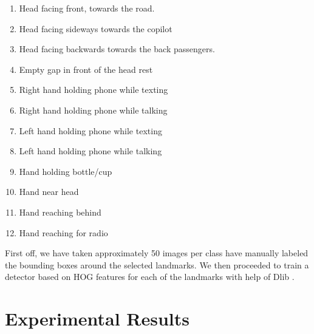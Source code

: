 \documentclass[10pt,twocolumn,letterpaper]{article}
\begin{document}
\begin{enumerate}
	\item Head facing front, towards the road.
	\item Head facing sideways towards the copilot
	\item Head facing backwards towards the back passengers.
	\item Empty gap in front of the head rest
	\item Right hand holding phone while texting
	\item Right hand holding phone while talking\
	\item Left hand holding phone while texting
	\item Left hand holding phone while talking
	\item Hand holding bottle/cup
	\item Hand near head
	\item Hand reaching behind
	\item Hand reaching for radio	
\end{enumerate}




First off, we have taken approximately 50 images per class have manually labeled the bounding boxes around the selected landmarks. We then proceeded to train a detector based on HOG features for each of the landmarks with  help of Dlib \cite{dlib09}. 










\section{Experimental Results}
\end{document}
